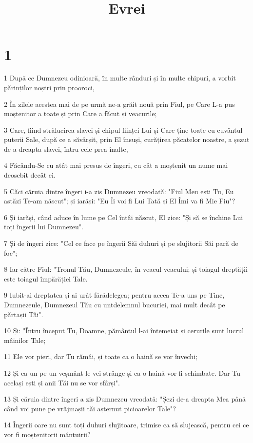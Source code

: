 

\title{Evrei}


\chapter{1}

\par 1 După ce Dumnezeu odinioară, în multe rânduri și în multe chipuri, a vorbit părinților noștri prin prooroci,
\par 2 În zilele acestea mai de pe urmă ne-a grăit nouă prin Fiul, pe Care L-a pus moștenitor a toate și prin Care a făcut și veacurile;
\par 3 Care, fiind strălucirea slavei și chipul ființei Lui și Care ține toate cu cuvântul puterii Sale, după ce a săvârșit, prin El însuși, curățirea păcatelor noastre, a șezut de-a dreapta slavei, întru cele prea înalte,
\par 4 Făcându-Se cu atât mai presus de îngeri, cu cât a moștenit un nume mai deosebit decât ei.
\par 5 Căci căruia dintre îngeri i-a zis Dumnezeu vreodată: "Fiul Meu ești Tu, Eu astăzi Te-am născut"; și iarăși: "Eu Îi voi fi Lui Tată și El Îmi va fi Mie Fiu"?
\par 6 Și iarăși, când aduce în lume pe Cel întâi născut, El zice: "Și să se închine Lui toți îngerii lui Dumnezeu".
\par 7 Și de îngeri zice: "Cel ce face pe îngerii Săi duhuri și pe slujitorii Săi pară de foc";
\par 8 Iar către Fiul: "Tronul Tău, Dumnezeule, în veacul veacului; și toiagul dreptății este toiagul împărăției Tale.
\par 9 Iubit-ai dreptatea și ai urât fărădelegea; pentru aceea Te-a uns pe Tine, Dumnezeule, Dumnezeul Tău cu untdelemnul bucuriei, mai mult decât pe părtașii Tăi".
\par 10 Și: "Întru început Tu, Doamne, pământul l-ai întemeiat și cerurile sunt lucrul mâinilor Tale;
\par 11 Ele vor pieri, dar Tu rămâi, și toate ca o haină se vor învechi;
\par 12 Și ca un pe un veșmânt le vei strânge și ca o haină vor fi schimbate. Dar Tu același ești și anii Tăi nu se vor sfârși".
\par 13 Și căruia dintre îngeri a zis Dumnezeu vreodată: "Șezi de-a dreapta Mea până când voi pune pe vrăjmașii tăi așternut picioarelor Tale"?
\par 14 Îngerii oare nu sunt toți duhuri slujitoare, trimise ca să slujească, pentru cei ce vor fi moștenitorii mântuirii?

